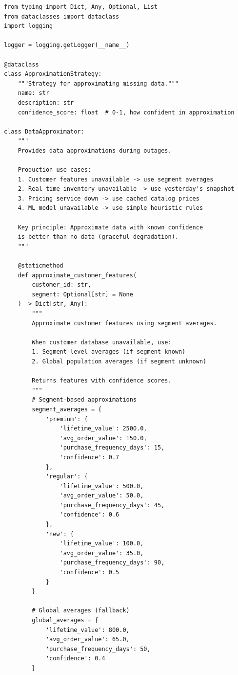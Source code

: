 \begin{lstlisting}[style=python, caption={Data Approximation Strategies}]
from typing import Dict, Any, Optional, List
from dataclasses import dataclass
import logging

logger = logging.getLogger(__name__)

@dataclass
class ApproximationStrategy:
    """Strategy for approximating missing data."""
    name: str
    description: str
    confidence_score: float  # 0-1, how confident in approximation

class DataApproximator:
    """
    Provides data approximations during outages.

    Production use cases:
    1. Customer features unavailable -> use segment averages
    2. Real-time inventory unavailable -> use yesterday's snapshot
    3. Pricing service down -> use cached catalog prices
    4. ML model unavailable -> use simple heuristic rules

    Key principle: Approximate data with known confidence
    is better than no data (graceful degradation).
    """

    @staticmethod
    def approximate_customer_features(
        customer_id: str,
        segment: Optional[str] = None
    ) -> Dict[str, Any]:
        """
        Approximate customer features using segment averages.

        When customer database unavailable, use:
        1. Segment-level averages (if segment known)
        2. Global population averages (if segment unknown)

        Returns features with confidence scores.
        """
        # Segment-based approximations
        segment_averages = {
            'premium': {
                'lifetime_value': 2500.0,
                'avg_order_value': 150.0,
                'purchase_frequency_days': 15,
                'confidence': 0.7
            },
            'regular': {
                'lifetime_value': 500.0,
                'avg_order_value': 50.0,
                'purchase_frequency_days': 45,
                'confidence': 0.6
            },
            'new': {
                'lifetime_value': 100.0,
                'avg_order_value': 35.0,
                'purchase_frequency_days': 90,
                'confidence': 0.5
            }
        }

        # Global averages (fallback)
        global_averages = {
            'lifetime_value': 800.0,
            'avg_order_value': 65.0,
            'purchase_frequency_days': 50,
            'confidence': 0.4
        }


\end{lstlisting}
